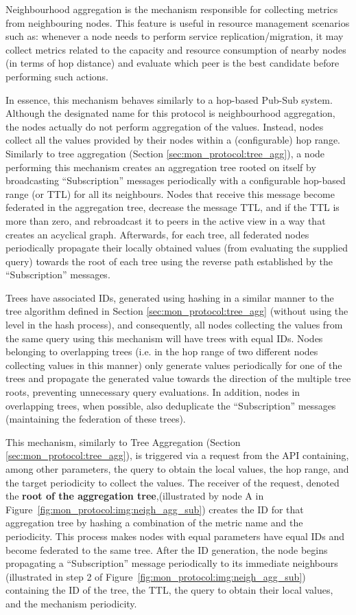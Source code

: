 Neighbourhood aggregation is the mechanism responsible for collecting metrics from neighbouring nodes. This feature is useful in resource management scenarios such as: whenever a node needs to perform service replication/migration, it may collect metrics related to the capacity and resource consumption of nearby nodes (in terms of hop distance) and evaluate which peer is the best candidate before performing such actions. 

In essence, this mechanism behaves similarly to a hop-based Pub-Sub system. Although the designated name for this protocol is neighbourhood aggregation, the nodes actually do not perform aggregation of the values. Instead, nodes collect all the values provided by their nodes within a (configurable) hop range. Similarly to tree aggregation (Section \ref{sec:mon_protocol:tree_agg}), a node performing this mechanism creates an aggregation tree rooted on itself by broadcasting ``Subscription'' messages periodically with a configurable hop-based range (or TTL) for all its neighbours. Nodes that receive this message become federated in the aggregation tree, decrease the message TTL, and if the TTL is more than zero, and rebroadcast it to peers in the active view in a way that creates an acyclical graph. Afterwards, for each tree, all federated nodes periodically propagate their locally obtained values (from evaluating the supplied query) towards the root of each tree using the reverse path established by the ``Subscription'' messages. 

Trees have associated IDs, generated using hashing in a similar manner to the tree algorithm defined in Section \ref{sec:mon_protocol:tree_agg} (without using the level in the hash process), and consequently, all nodes collecting the values from the same query using this mechanism will have trees with equal IDs. Nodes belonging to overlapping trees (i.e. in the hop range of two different nodes collecting values in this manner) only generate values periodically for one of the trees and propagate the generated value towards the direction of the multiple tree roots, preventing unnecessary query evaluations. In addition, nodes in overlapping trees, when possible, also deduplicate the ``Subscription'' messages (maintaining the federation of these trees).

This mechanism, similarly to Tree Aggregation (Section \ref{sec:mon_protocol:tree_agg}), is triggered via a request from the API containing, among other parameters, the query to obtain the local values, the hop range, and the target periodicity to collect the values. The receiver of the request, denoted the \textbf{root of the aggregation tree},(illustrated by node A in Figure~\ref{fig:mon_protocol:img:neigh_agg_sub}) creates the ID for that aggregation tree by hashing a combination of the metric name and the periodicity. This process makes nodes with equal parameters have equal IDs and become federated to the same tree. After the ID generation, the node begins propagating a ``Subscription'' message periodically to its immediate neighbours (illustrated in step 2 of Figure~\ref{fig:mon_protocol:img:neigh_agg_sub}) containing the ID of the tree, the TTL, the query to obtain their local values, and the mechanism periodicity. 

